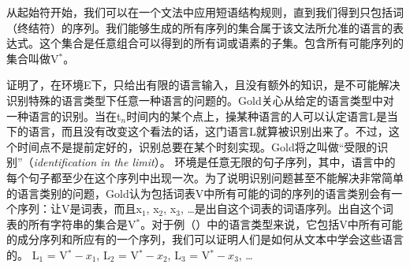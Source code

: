 从起始符开始，我们可以在一个文法中应用短语结构规则，直到我们得到只包括词（终结符）的序列。我们能够生成的所有序列的集合属于该文法所允准的语言的表达式。这个集合是任意组合可以得到的所有词或语素的子集。包含所有可能序列的集合叫做V$^*$。
  
\cite{Gold67a}证明了，在环境E下，只给出有限的语言输入，且没有额外的知识，是不可能解决识别特殊的语言类型下任意一种语言的问题的。Gold关心从给定的语言类型中对一种语言的识别。当在t$_n$时间内的某个点上，操某种语言的人可以认定语言L是当下的语言，而且没有改变这个看法的话，这门语言L就算被识别出来了。不过，这个时间点不是提前定好的，识别总要在某个时刻实现。Gold将之叫做“受限的识别”（\emph{identification in the limit}）。
环境是任意无限的句子序列，其中，语言中的每个句子都至少在这个序列中出现一次。为了说明识别问题甚至不能解决非常简单的语言类别的问题，Gold认为包括词表V中所有可能的词的序列的语言类别会有一个序列：让V是词表，而且x$_1$, x$_2$, x$_3$, \ldots{}是出自这个词表的词语序列。出自这个词表的所有字符串的集合是V$^*$。对于例（）中的语言类型来说，它包括V中所有可能的成分序列和所应有的一个序列，我们可以证明人们是如何从文本中学会这些语言的。
\ea
L$_1$ = V$^* - x_1$, L$_2$ = V$^* - x_2$, L$_3$ = V$^* - x_3$, \ldots
\z

